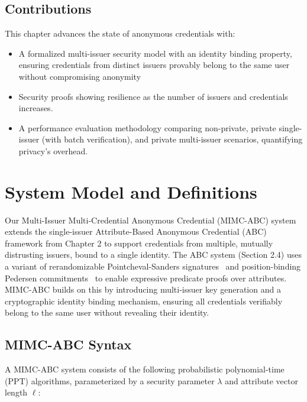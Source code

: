 \subsection{Contributions}
This chapter advances the state of anonymous credentials with:
\begin{itemize}
    \item A formalized multi-issuer security model with an identity binding property, ensuring credentials from distinct issuers provably belong to the same user without compromising anonymity
    \item Security proofs showing resilience as the number of issuers and credentials increases.
    \item A performance evaluation methodology comparing non-private, private single-issuer (with batch verification), and private multi-issuer scenarios, quantifying privacy’s overhead.
\end{itemize}






\section{System Model and Definitions}

Our Multi-Issuer Multi-Credential Anonymous Credential (MIMC-ABC) system extends the single-issuer Attribute-Based Anonymous Credential (ABC) framework from Chapter 2 to support credentials from multiple, mutually distrusting issuers, bound to a single identity. The ABC system (Section 2.4) uses a variant of rerandomizable Pointcheval-Sanders signatures~\cite{sako_short_2016} and position-binding Pedersen commitments~\cite{tomescu2022utt} to enable expressive predicate proofs over attributes. MIMC-ABC builds on this by introducing multi-issuer key generation and a cryptographic identity binding mechanism, ensuring all credentials verifiably belong to the same user without revealing their identity.

\subsection{MIMC-ABC Syntax}

A MIMC-ABC system consists of the following probabilistic polynomial-time (PPT) algorithms, parameterized by a security parameter $\lambda$ and attribute vector length $\ell$:


